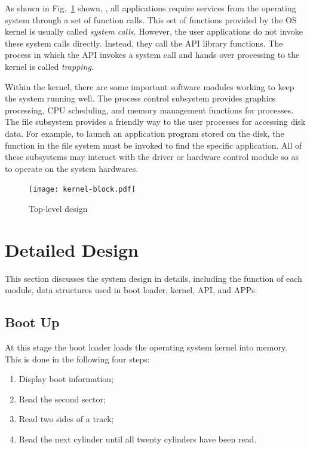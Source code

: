 \documentclass{swfcthesis}
\begin{document}
As shown in Fig.~\ref{fig:top-level} shown, , all applications
require services from the
operating system through a set of function calls. This set of functions provided by the OS
kernel is usually called \emph{system calls}. However, the user applications do not invoke
these system calls directly. Instead, they call the API library functions. The process in
which the API invokes a system call and hands over processing to the kernel is called
\emph{trapping}.

Within the kernel, there are some important software modules working to keep the system
running well. The process control subsystem provides graphics processing, CPU scheduling,
and memory management functions for processes.  The file
subsystem provides a friendly way to the user processes for accessing disk data. For
example, to launch an application program stored on the disk, the function in the file
system must be invoked to find the specific application. All of these subsystems may
interact with the driver or hardware control module so as to operate on the system
hardwares.

\begin{figure}%
  \centering
  \texttt{[image: kernel-block.pdf]}
  \caption{Top-level design}
  \label{fig:top-level}
\end{figure}


\section{Detailed Design}
\label{sec:detailed-design}

This section discusses the system design in details, including the function of each
module, data structures used in boot loader, kernel, API, and APPs.

\subsection{Boot Up}
\label{sec:boot-up}

At this stage the boot loader loads the operating system kernel into memory. This is done
in the following four steps:
\begin{enumerate}
\item Display boot information;
\item Read the second sector;
\item Read two sides of a track;
\item Read the next cylinder until all twenty cylinders have been read.
\end{enumerate}
\end{document}
